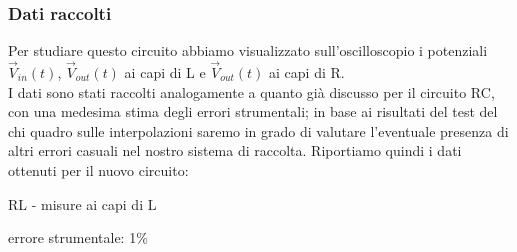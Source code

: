 \documentclass{article}
\theoremstyle{definition}
\begin{document}
\subsubsection*{Dati raccolti}
Per studiare questo circuito abbiamo visualizzato sull'oscilloscopio i potenziali \(\vec{V}_{in}(t)\), \(\vec{V}_{out}(t)\) ai capi di L e \(\vec{V}_{out}(t)\) ai capi di R. \\
I dati sono stati raccolti analogamente a quanto già discusso per il circuito RC, con una medesima stima degli errori strumentali; in base ai risultati del test del chi quadro sulle interpolazioni saremo in grado di valutare l'eventuale presenza di altri errori casuali nel nostro sistema di raccolta. Riportiamo quindi i dati ottenuti per il nuovo circuito:

\begin{table}[!htbp]
\centering
    \captionsetup{labelformat=empty}
    	 \caption{RL - misure ai capi di L}
\caption{errore strumentale: 1\%}
\caption{Nota: le misure per \(\phi_{AB}\) e \(\phi_{B}\) relative a 625Hz non sono state riportate poichè lo strumento restituiva numerosi valori inconsistenti, quindi da noi ritenuti non significativi. }
\end{table}
\end{document}
